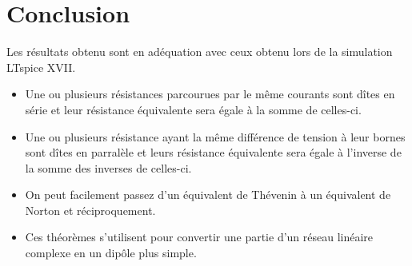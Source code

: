 \documentclass{homeworg}
\begin{document}
\section{Conclusion}
    Les résultats obtenu sont en adéquation avec ceux obtenu lors de la simulation LTspice XVII.
    \begin{itemize}
        \item Une ou plusieurs résistances parcourues par le même courants sont dîtes en série et leur résistance équivalente sera égale à la somme de celles-ci.
        \item Une ou plusieurs résistance ayant la même différence de tension à leur bornes sont dîtes en parralèle et leurs résistance équivalente sera égale à l'inverse de la somme des inverses de celles-ci.
        \item On peut facilement passez d'un équivalent de Thévenin à un équivalent de Norton et réciproquement.
        \item  Ces théorèmes s'utilisent pour convertir une partie d'un réseau linéaire complexe en un dipôle plus simple.
    \end{itemize}
\end{document}

